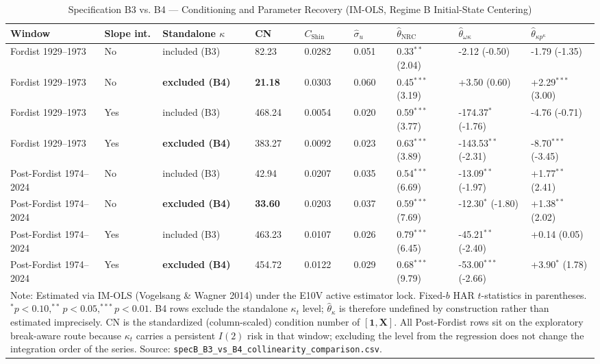 \documentclass[11pt,a4paper]{article}
\begin{document}
\begin{landscape}
\begin{table}[H]
\centering
\caption{Specification B3 vs. B4 --- Conditioning and Parameter Recovery (IM-OLS, Regime B Initial-State Centering)}
\label{tab:specB_b3_vs_b4}
\small
\begin{tabular}{p{4.2cm}p{1.4cm}p{2.6cm}p{1.7cm}p{1.9cm}p{1.7cm}p{2.6cm}p{3.0cm}p{2.9cm}}
\toprule
Window & Slope int. & Standalone $\kappa$ & CN & $C_{\text{Shin}}$ & $\hat{\sigma}_u$ & $\hat{\theta}_{\text{NRC}}$ & $\hat{\theta}_{\omega \kappa}$ & $\hat{\theta}_{\kappa p^{\kappa}}$ \\
\midrule
Fordist 1929--1973 & No & included (B3) & 82.23 & 0.0282 & 0.051 & 0.33$^{**}$ (2.04) & -2.12 (-0.50) & -1.79 (-1.35) \\
Fordist 1929--1973 & No & \textbf{excluded (B4)} & \textbf{21.18} & 0.0303 & 0.060 & 0.45$^{***}$ (3.19) & +3.50 (0.60) & +2.29$^{***}$ (3.00) \\
Fordist 1929--1973 & Yes & included (B3) & 468.24 & 0.0054 & 0.020 & 0.59$^{***}$ (3.77) & -174.37$^{*}$ (-1.76) & -4.76 (-0.71) \\
Fordist 1929--1973 & Yes & \textbf{excluded (B4)} & 383.27 & 0.0092 & 0.023 & 0.63$^{***}$ (3.89) & -143.53$^{**}$ (-2.31) & -8.70$^{***}$ (-3.45) \\
\midrule
Post-Fordist 1974--2024 & No & included (B3) & 42.94 & 0.0207 & 0.035 & 0.54$^{***}$ (6.69) & -13.09$^{**}$ (-1.97) & +1.77$^{**}$ (2.41) \\
Post-Fordist 1974--2024 & No & \textbf{excluded (B4)} & \textbf{33.60} & 0.0203 & 0.037 & 0.59$^{***}$ (7.69) & -12.30$^{*}$ (-1.80) & +1.38$^{**}$ (2.02) \\
Post-Fordist 1974--2024 & Yes & included (B3) & 463.23 & 0.0107 & 0.026 & 0.79$^{***}$ (6.45) & -45.21$^{**}$ (-2.40) & +0.14 (0.05) \\
Post-Fordist 1974--2024 & Yes & \textbf{excluded (B4)} & 454.72 & 0.0122 & 0.029 & 0.68$^{***}$ (9.79) & -53.00$^{***}$ (-2.66) & +3.90$^{*}$ (1.78) \\
\bottomrule
\multicolumn{9}{p{22.5cm}}{\footnotesize Note: Estimated via IM-OLS (Vogelsang \& Wagner 2014) under the E10V active estimator lock. Fixed-$b$ HAR $t$-statistics in parentheses. $^{*}p<0.10, ^{**}p<0.05, ^{***}p<0.01$. B4 rows exclude the standalone $\kappa_t$ level; $\hat{\theta}_{\kappa}$ is therefore undefined by construction rather than estimated imprecisely. CN is the standardized (column-scaled) condition number of $[\mathbf{1}, \mathbf{X}]$. All Post-Fordist rows sit on the exploratory break-aware route because $\kappa_t$ carries a persistent $I(2)$ risk in that window; excluding the level from the regression does not change the integration order of the series. Source: \texttt{specB\_B3\_vs\_B4\_collinearity\_comparison.csv}.}
\end{tabular}
\end{table}
\end{landscape}
\end{document}
